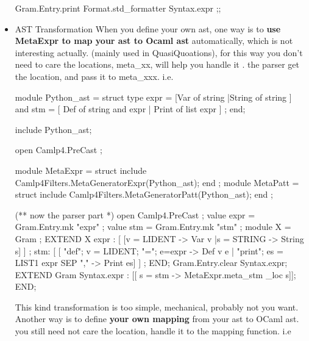 \begin{itemize}
\begin{ocamlcode}
Gram.Entry.print Format.std_formatter Syntax.expr ;; 
\end{ocamlcode}



 \item AST Transformation 
  When you define your own ast, one way is to {\bf use MetaExpr to map your ast to Ocaml ast}
  automatically, which is not interesting actually. (mainly used in QuasiQuoations), for this way you don't need to care the locations, meta\_xx, will help you handle it . the parser
  get the location, and pass it to meta\_xxx. i.e. 


\begin{ocamlcode}
module Python_ast = struct 
  type expr  = 
    [Var of string 
    |String of string  ]
  and stm   = 
    [ Def of string and expr 
    | Print of list expr ] ; 
end; 

include Python_ast;

open Camlp4.PreCast ; 

module MetaExpr = struct 
  include Camlp4Filters.MetaGeneratorExpr(Python_ast);
end ; 
module MetaPatt = struct 
  include Camlp4Filters.MetaGeneratorPatt(Python_ast);
end ; 

(** now the parser part *)
open Camlp4.PreCast ; 
value expr = Gram.Entry.mk "expr" ; 
value stm = Gram.Entry.mk "stm" ;
module X = Gram ; 
EXTEND X 
  expr : [
    [v = LIDENT -> Var v
    |s = STRING ->  String s]
  ]
  ;
  stm: [
    [ "def"; v = LIDENT; "="; e=expr -> Def v e
    | "print"; es = LIST1 expr SEP "," -> Print es]
  ]
  ;
END;  
Gram.Entry.clear Syntax.expr; 
EXTEND Gram 
  Syntax.expr : 
  [[ s = stm -> MetaExpr.meta_stm  _loc  s]]; 
END; 

\end{ocamlcode}


This kind transformation is too simple, mechanical, probably not you want.  
Another way is to define {\bf your own mapping} from your ast to OCaml ast. you still need not care the location, handle it to the mapping function. i.e 



\end{itemize}
